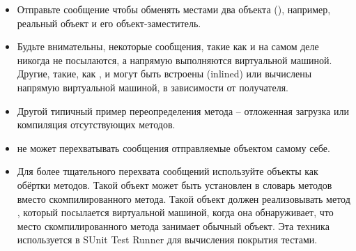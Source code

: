 \documentclass[a4paper,10pt,twoside]{book}
\begin{document}
\begin{itemize}
\item Отправьте сообщение  чтобы обменять местами два объекта (), например, реальный объект и его объект-заместитель.
\item Будьте внимательны, некоторые сообщения, такие как  и  на самом деле никогда не посылаются, а напрямую выполняются виртуальной машиной. Другие, такие, как \ct{+}, \ct{-} и  могут быть встроены (inlined) или вычислены напрямую виртуальной машиной, в зависимости от получателя.
\item Другой типичный пример переопределения метода  -- отложенная загрузка или компиляция отсутствующих методов.
\item {} не может перехватывать сообщения отправляемые объектом самому себе.
\item Для более тщательного перехвата сообщений используйте объекты как обёртки методов. Такой объект может быть установлен в словарь методов вместо скомпилированного метода. Такой объект должен реализовывать метод , который посылается виртуальной машиной, когда она обнаруживает, что место скомпилированного метода занимает обычный объект. Эта техника используется в SUnit Test Runner  для вычисления покрытия тестами.
\end{itemize}

\ifx\wholebook\relax\else
   
   
\end{document}
